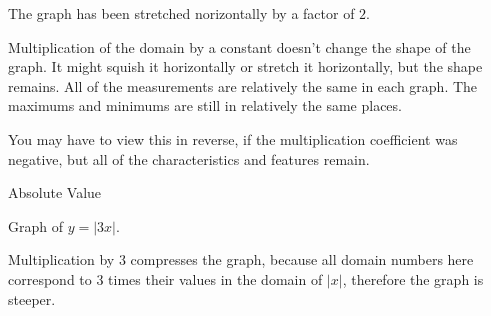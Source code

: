 \documentclass{ximera}
\begin{document}
The graph has been stretched norizontally by a factor of $2$.

Multiplication of the domain by a constant doesn't change the shape of the graph.  It might squish it horizontally or stretch it horizontally, but the shape remains.  All of the measurements are relatively the same in each graph. The maximums and minimums are still in relatively the same places.  

You may have to view this in reverse, if the multiplication coefficient was negative, but all of the characteristics and features remain.








\begin{example} Absolute Value



Graph of $y = |3x|$.



\begin{image}
\end{image}



Multiplication by $3$ compresses the graph, because all domain numbers here correspond to $3$ times their values in the domain of $|x|$, therefore the graph is steeper.






\end{example}
\end{document}
